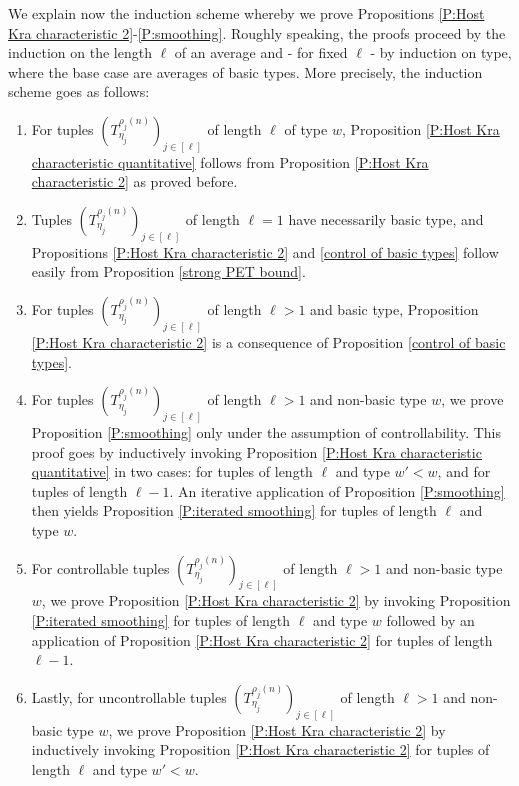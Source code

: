 \documentclass[11pt]{amsart}
\theoremstyle{definition}
\begin{document}
We explain now the induction scheme whereby we prove Propositions \ref{P:Host Kra characteristic 2}-\ref{P:smoothing}. Roughly speaking, the proofs proceed by the induction on the length $\ell$ of an average and - for fixed $\ell$ - by induction on type, where the base case are averages of basic types. More precisely, the induction scheme goes as follows:
\begin{enumerate}
    \item For tuples $(T_{\eta_j}^{\rho_j(n)})_{j\in[\ell]}$ of length $\ell$ of type $w$, Proposition \ref{P:Host Kra characteristic quantitative} follows from Proposition \ref{P:Host Kra characteristic 2} as proved before.
    \item Tuples $(T_{\eta_j}^{\rho_j(n)})_{j\in[\ell]}$ of length $\ell = 1$ have necessarily basic type, and Propositions \ref{P:Host Kra characteristic 2} and \ref{control of basic types} %
     follow easily from Proposition \ref{strong PET bound}.
    \item For tuples $(T_{\eta_j}^{\rho_j(n)})_{j\in[\ell]}$ of length $\ell>1$ and basic type, Proposition \ref{P:Host Kra characteristic 2} is a  consequence of Proposition \ref{control of basic types}.
    \item For tuples $(T_{\eta_j}^{\rho_j(n)})_{j\in[\ell]}$ of length $\ell>1$ and non-basic type $w$, we prove Proposition \ref{P:smoothing} only under the assumption of controllability. This proof goes by inductively invoking Proposition \ref{P:Host Kra characteristic quantitative} in two cases: for tuples of length $\ell$ and type $w'<w$, and for tuples of length $\ell-1$. An iterative application of Proposition \ref{P:smoothing} then yields Proposition \ref{P:iterated smoothing} for tuples of length $\ell$ and type $w$.
    \item  For controllable tuples $(T_{\eta_j}^{\rho_j(n)})_{j\in[\ell]}$ of length $\ell>1$ and non-basic type $w$, we prove Proposition \ref{P:Host Kra characteristic 2} by invoking Proposition \ref{P:iterated smoothing} for tuples of length $\ell$ and type $w$ followed by an application of Proposition \ref{P:Host Kra characteristic 2} for tuples of length $\ell-1$.
    \item Lastly, for uncontrollable tuples $(T_{\eta_j}^{\rho_j(n)})_{j\in[\ell]}$ of length $\ell>1$ and non-basic type $w$, we prove Proposition \ref{P:Host Kra characteristic 2} by inductively invoking Proposition \ref{P:Host Kra characteristic 2} for tuples of length $\ell$ and type $w'<w$.
\end{enumerate}
\end{document}
